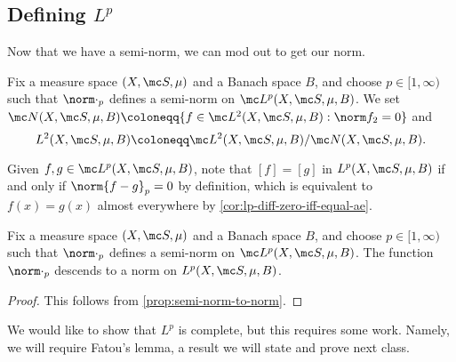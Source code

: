 \documentclass[../notes.tex]{subfiles}
\begin{document}
\subsection{Defining \texorpdfstring{$L^p$}{ Lp}}
Now that we have a semi-norm, we can mod out to get our norm.
\begin{notation}
	Fix a measure space $(X,\mc S,\mu)$ and a Banach space $B$, and choose $p\in[1,\infty)$ such that $\norm\cdot_p$ defines a semi-norm on $\mc L^p(X,\mc S,\mu,B)$. We set $\mc N(X,\mc S,\mu,B)\coloneqq\{f\in\mc L^2(X,\mc S,\mu,B):\norm f_2=0\}$ and
	\[L^2(X,\mc S,\mu,B)\coloneqq\mc L^2(X,\mc S,\mu,B)/\mc N(X,\mc S,\mu,B).\]
\end{notation}
\begin{remark}
	Given $f,g\in\mc L^p(X,\mc S,\mu,B)$, note that $[f]=[g]$ in $L^p(X,\mc S,\mu,B)$ if and only if $\norm{f-g}_p=0$ by definition, which is equivalent to $f(x)=g(x)$ almost everywhere by \autoref{cor:lp-diff-zero-iff-equal-ae}.
\end{remark}
\begin{proposition} \label{prop:lp-norm}
	Fix a measure space $(X,\mc S,\mu)$ and a Banach space $B$, and choose $p\in[1,\infty)$ such that $\norm\cdot_p$ defines a semi-norm on $\mc L^p(X,\mc S,\mu,B)$. The function $\norm\cdot_p$ descends to a norm on $L^p(X,\mc S,\mu,B)$.
\end{proposition}
\begin{proof}
	This follows from \autoref{prop:semi-norm-to-norm}.
\end{proof}
We would like to show that $L^p$ is complete, but this requires some work. Namely, we will require Fatou's lemma, a result we will state and prove next class.
\end{document}
